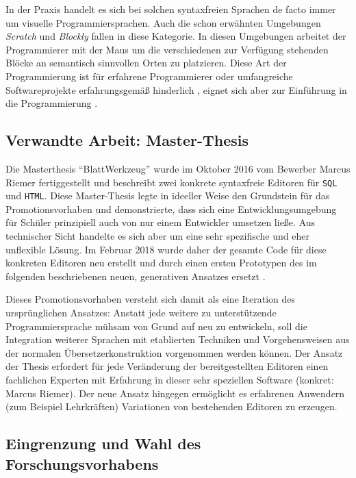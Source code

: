 \documentclass[paper=a4,fontsize=11pt,parskip=half]{scrartcl}
\begin{document}
In der Praxis handelt es sich bei solchen syntaxfreien Sprachen de facto immer um visuelle Programmiersprachen. Auch die schon erwähnten Umgebungen \textit{Scratch} und \textit{Blockly} fallen in diese Kategorie. In diesen Umgebungen arbeitet der Programmierer mit der Maus um die verschiedenen zur Verfügung stehenden Blöcke an semantisch sinnvollen Orten zu platzieren. Diese Art der Programmierung ist für erfahrene Programmierer oder umfangreiche Softwareprojekte erfahrungsgemäß hinderlich \cite[S. 262f]{schiffer_visuelle_2001}, eignet sich aber zur Einführung in die Programmierung \cite{resnick_scratch:_2009}.

\subsection{Verwandte Arbeit: Master-Thesis}

Die Masterthesis \enquote{BlattWerkzeug} \cite{riemer_blattwerkzeug_2016}  wurde im Oktober 2016 vom Bewerber Marcus Riemer fertiggestellt und beschreibt zwei konkrete syntaxfreie Editoren für \texttt{SQL} und \texttt{HTML}. Diese Master-Thesis legte in ideeller Weise den Grundstein für das Promotionsvorhaben und demonstrierte, dass sich eine Entwicklungsumgebung für Schüler prinzipiell auch von nur einem Entwickler umsetzen ließe. Aus technischer Sicht handelte es sich aber um eine sehr spezifische und eher unflexible Lösung. Im Februar 2018 wurde daher der gesamte Code für diese konkreten Editoren neu erstellt und durch einen ersten Prototypen des im folgenden beschriebenen neuen, generativen Ansatzes ersetzt \cite{riemer_commit_2018}.

Dieses Promotionsvorhaben versteht sich damit als eine Iteration des ursprünglichen Ansatzes: Anstatt jede weitere zu unterstützende Programmiersprache mühsam von Grund auf neu zu entwickeln, soll die Integration weiterer Sprachen mit etablierten Techniken und Vorgehensweisen aus der normalen Übersetzerkonstruktion vorgenommen werden können. Der Ansatz der Thesis erfordert für jede Veränderung der bereitgestellten Editoren einen fachlichen Experten mit Erfahrung in dieser sehr speziellen Software (konkret: Marcus Riemer). Der neue Ansatz hingegen ermöglicht es erfahrenen Anwendern (zum Beispiel Lehrkräften) Variationen von bestehenden Editoren zu erzeugen.

\subsection{Eingrenzung und Wahl des Forschungsvorhabens}
\end{document}
